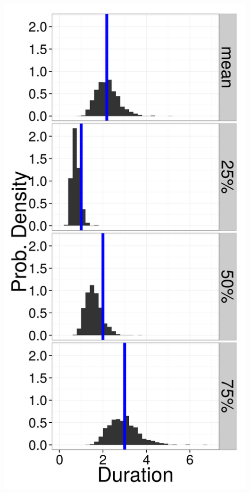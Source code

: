 \documentclass{beamer}
\begin{document}
\begin{frame}
\begin{columns}
\begin{column}{0.5\textwidth}
\begin{center}
      \end{center}
    \end{column}
    \begin{column}{0.5\textwidth}
      \begin{center}
        \includegraphics[height = 0.8\textheight, width = \textwidth,  keepaspectratio = true]{figure/quant_ppc}
      \end{center}
    \end{column}
  \end{columns}
\end{frame}
\end{document}
